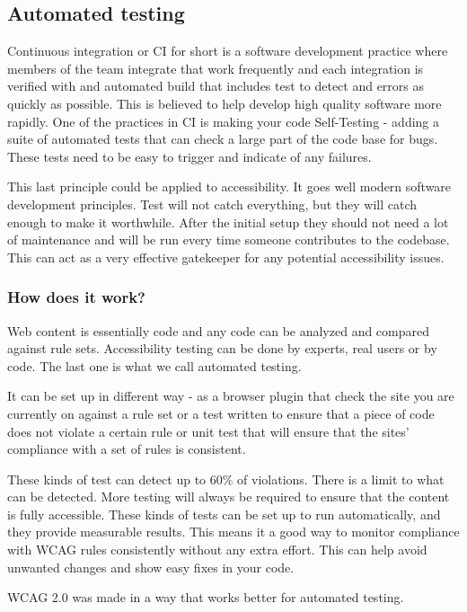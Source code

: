 \documentclass{master_thesis}
\begin{document}
\subsection{Automated testing}
Continuous integration or CI for short  is a software development practice where members of the team integrate that work frequently and each integration is verified with and automated build that includes test to detect and errors as quickly as possible. This is believed to help develop high quality software more rapidly. One of the practices in CI is making your code Self-Testing - adding a suite of automated tests that can check a large part of the code base for bugs. These tests need to be easy to trigger and indicate of any failures.
\citep{Fowler2006}

This last principle could be applied to accessibility. It goes well modern software development principles. Test will not catch everything, but they will catch enough to make it worthwhile. After the initial setup they should not need a lot of maintenance and will be run every time someone contributes to the codebase. This can act as a very effective gatekeeper for any potential accessibility issues.

\subsubsection{How does it work?}

Web content is essentially code and any code can be analyzed and compared against rule sets. Accessibility testing can be done by experts, real users or by code. The last one is what we call automated testing.

It can be set up in different way - as a browser plugin that check the site you are currently on against a rule set or a test written to ensure that a piece of code does not violate a certain rule or unit test that will ensure that the sites' compliance with a set of rules is consistent.

These kinds of test can detect up to 60\% of violations. 
There is a limit to what can be detected. More testing will always be required to ensure that the content is fully accessible. These kinds of tests can be set up to run automatically, and they provide measurable results. This means it a good way to monitor compliance with WCAG rules consistently without any extra effort. This can help avoid unwanted changes and show easy fixes in  your code.

WCAG 2.0 was made in a way that works better for automated testing. 
\end{document}
